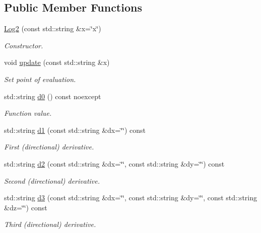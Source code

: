 \subsection*{Public Member Functions}
\begin{DoxyCompactItemize}
\item 
\hyperlink{structFunG_1_1stringify_1_1Log2_a9ca84817ee0689d515ce529eb596f0ae}{Log2} (const std\-::string \&x=\char`\"{}x\char`\"{})
\begin{DoxyCompactList}\small\item\em Constructor. \end{DoxyCompactList}\item 
void \hyperlink{structFunG_1_1stringify_1_1Log2_a51e1ac2c3bdc5bbcc8684f69c118da4a}{update} (const std\-::string \&x)
\begin{DoxyCompactList}\small\item\em Set point of evaluation. \end{DoxyCompactList}\item 
std\-::string \hyperlink{structFunG_1_1stringify_1_1Log2_ab088996bbeb248688ec005cf608f37bc}{d0} () const noexcept
\begin{DoxyCompactList}\small\item\em Function value. \end{DoxyCompactList}\item 
std\-::string \hyperlink{structFunG_1_1stringify_1_1Log2_a6bdb51218c6412b6c816a9cbb1671383}{d1} (const std\-::string \&dx=\char`\"{}\char`\"{}) const 
\begin{DoxyCompactList}\small\item\em First (directional) derivative. \end{DoxyCompactList}\item 
std\-::string \hyperlink{structFunG_1_1stringify_1_1Log2_a91671f64fa548b8a57ebb2e739655ce2}{d2} (const std\-::string \&dx=\char`\"{}\char`\"{}, const std\-::string \&dy=\char`\"{}\char`\"{}) const 
\begin{DoxyCompactList}\small\item\em Second (directional) derivative. \end{DoxyCompactList}\item 
std\-::string \hyperlink{structFunG_1_1stringify_1_1Log2_a8414dba74d3dd9ae58735bcc6e10123c}{d3} (const std\-::string \&dx=\char`\"{}\char`\"{}, const std\-::string \&dy=\char`\"{}\char`\"{}, const std\-::string \&dz=\char`\"{}\char`\"{}) const 
\begin{DoxyCompactList}\small\item\em Third (directional) derivative. \end{DoxyCompactList}\end{DoxyCompactItemize}


